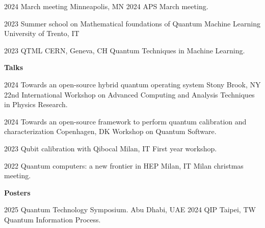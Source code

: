 \documentclass[9pt]{developercv} %
\begin{document}
\begin{entrylist}

    \entry
        {2024}
        {\small{March meeting}}
        {Minneapolis, MN}
        {2024 APS March meeting.}
        {}

    \entry
        {2023}
        {\small{Summer school on Mathematical foundations of Quantum Machine Learning}}
        {University of Trento, IT}
        {}
        {}
         
    \entry
        {2023}
        {\small{QTML}}
        {CERN, Geneva, CH}
        {Quantum Techniques in Machine Learning.}
        {}



\end{entrylist}
\textbf{Talks}\\
\begin{entrylist}
    \entry
        {2024}
        {\small{Towards an open-source hybrid quantum operating system}}
        {Stony Brook, NY}
        {22nd International Workshop on Advanced Computing and Analysis Techniques in Physics Research.}
        {}

    \entry
        {2024}
        {\small{Towards an open-source framework to perform quantum calibration and characterization}}
        {Copenhagen, DK}
        {Workshop on Quantum Software.}
        {}

    \entry
        {2023}
        {\small{Qubit calibration with Qibocal}}
        {Milan, IT}
        {First year workshop.}
        {}

    \entry
        {2022}
        {\small{Quantum computers: a new frontier in HEP}}
        {Milan, IT}
        {Milan christmas meeting.}
        {}
\end{entrylist}

\textbf{Posters}\\
\begin{entrylist}
    \entry
        {2025}
        {Quantum Technology Symposium.}
        {Abu Dhabi, UAE}
        {}
        {}
    \entry
        {2024}
        {QIP}
        {Taipei, TW}
        {Quantum Information Process.}
        {}
\end{entrylist}



\end{document}
